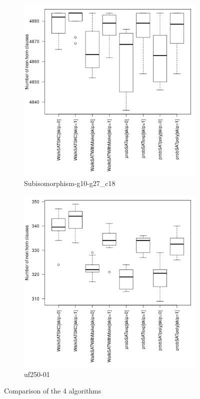 \documentclass[12pt,a4paper]{article}
\begin{document}
\begin{figure}[H]
  \begin{subfigure}[!t]{0.4\textwidth}
    \includegraphics[width=\textwidth]{boxplots/boxPlotSubisomorphism-g10-g27_c18.png}
    \caption{Subisomorphism-g10-g27\_c18}
  \end{subfigure}
  \begin{subfigure}[!t]{0.4\textwidth}
    \includegraphics[width=\textwidth]{boxplots/boxPlotuf250-01.png}
    \caption{uf250-01}
  \end{subfigure}
  \caption{Comparison of the 4 algorithms}
  \label{fig:boxplots}
\end{figure}
\end{document}
